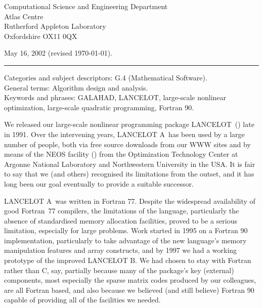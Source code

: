 \documentclass[twoside]{article}
\newcommand{\gal}{{\sf GALAHAD}}
\newcommand{\lan}{{\sf LANCELOT}}
\newcommand{\lana}{{\sf LANCELOT A}}
\newcommand{\lanb}{{\sf LANCELOT B}}
\begin{document}
\begin{titlepage}
\vspace{0.6 cm}

\noindent 
Computational Science and Engineering Department
\\
Atlas Centre
\\
Rutherford Appleton Laboratory
\\
Oxfordshire OX11 0QX

\vspace{0.1 cm}
\noindent May 16, 2002 \hspace*{0.01cm} (revised \today).
\vspace{0.5 cm}

\noindent \rule{\textwidth}{0.001in}

\vspace{0.2 cm}
\noindent
Categories and subject descriptors: G.4 (Mathematical Software). \\
General terms: Algorithm design and analysis. \\
Keywords and phrases: \gal, \lan, large-scale nonlinear optimization, 
large-scale quadratic programming,
Fortran 90.

\end{titlepage}




\setcounter{page}{1}

We released our large-scale nonlinear programming package \lan\
() late in 1991. Over the intervening
years, \lana\ has been used by a large number of people, both
via free source downloads from our WWW sites
and by means of the NEOS facility ()
from the Optimization Technology Center at
Argonne National Laboratory and Northwestern University in the USA.
It is fair to say that we (and others) recognised its limitations
from the outset, and it has long been our goal eventually to provide 
a suitable successor.

\lana\ was written in Fortran 77. 
Despite the widespread availability of good 
Fortran~77 compilers, the limitations of the language, particularly
the absence of standardised memory allocation facilities, proved to be
a serious limitation, especially for large problems. 
Work started in 1995 on a Fortran 90 implementation,
particularly to take advantage of the new language's 
memory manipulation features and array constructs, and by 1997 we had a 
working prototype of the improved \lanb. We had chosen to stay with
Fortran rather than C, say, partially because many of the package's 
key (external) components, most especially the \citebb{hsl:2002}
sparse matrix codes
produced by our colleagues, are all Fortran based, and also because
we believed (and still believe) Fortran 90 capable of providing
all of the facilities we needed.
\end{document}
